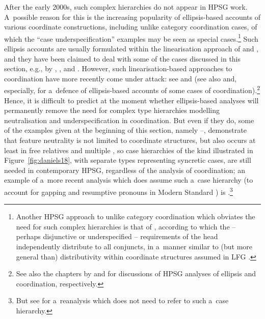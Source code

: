 \documentclass[output=paper,biblatex,babelshorthands,newtxmath,draftmode,colorlinks,citecolor=brown]{langscibook}
\begin{document}
\begin{exe}
\begin{xlist}
\begin{exe}
\begin{xlist}
After the early 2000s, such complex  hierarchies do not appear in HPSG work.  A~possible
reason for this is the increasing popularity of ellipsis-based accounts of various coordinate
constructions, including unlike category coordination cases, of which the “case underspecification”
examples %
 may be seen as special cases.\footnote{Another HPSG
  approach to unlike category coordination which obviates the need for such complex hierarchies is
  that of \citet{yata:04}, according to which the – perhaps disjunctive or underspecified –
  requirements of the head independently distribute to all conjuncts, in a~manner similar to (but
  more general than) distributivity within coordinate structures assumed in LFG
  \citep{DK2000a,dal:kin:sad:09,prz:pat:12a}.}  Such ellipsis accounts are usually formulated within
the linearisation approach of \citet{Reape92a,Reape94a} and \citet{Kathol95a}, and they have
been claimed to deal with some of the cases discussed in this section, e.g., by
\citet{Crysmann2003c}, \citet{BS2004a}, and \citet{chav:06,chav:08}.  However, such
linearisation-based approaches to coordination have more recently come under attack: see
\citet{levi:11} and \citet{kub:lev:15} (see also \citealt{yata:12,Yatabe2016a-u} and, especially,
\citealt{yat:wai:18} for a~defence of ellipsis-based accounts of some cases of coordination).\footnote{%
See also the chapters by \citet{chapters/ellipsis} and \citet{chapters/coordination} for discussions of HPSG analyses of ellipsis and coordination, respectively.}
Hence, it is difficult to predict at the moment whether ellipsis-based analyses will permanently
remove the need for complex type hierarchies modelling neutralisation and underspecification in
coordination.  But even if they do, some of the examples given at the beginning of this section,
namely –, demonstrate that feature neutrality is not limited to
coordinate structures, but also occurs at least in free relatives and multiple , so case
hierarchies of the kind illustrated in Figure~\ref{fig:daniels18}, with separate types representing syncretic cases, are still needed in contemporary HPSG, regardless of the analysis of coordination; an example of a~more recent analysis which does assume such a~case hierarchy (to account for gapping and resumptive pronouns in Modern Standard ) is \citet{AB2013a-u}.\footnote{But see \citet{crys:17} for a~reanalysis which does not need to refer to such a~case hierarchy.}




\end{xlist}
\end{exe}
\end{xlist}
\end{exe}
\end{document}
